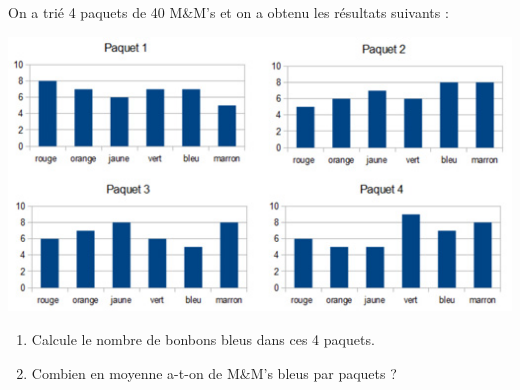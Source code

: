 
On a trié 4 paquets de 40 M\&M's et on a obtenu les résultats suivants : 


\begin{center}
 \includegraphics[scale=0.5]{mms1.jpg}
 \end{center} 


\begin{enumerate}
\item Calcule le nombre de bonbons bleus dans ces 4 paquets.
\item Combien en moyenne a-t-on de M\&M's bleus par paquets ? 
\end{enumerate}

